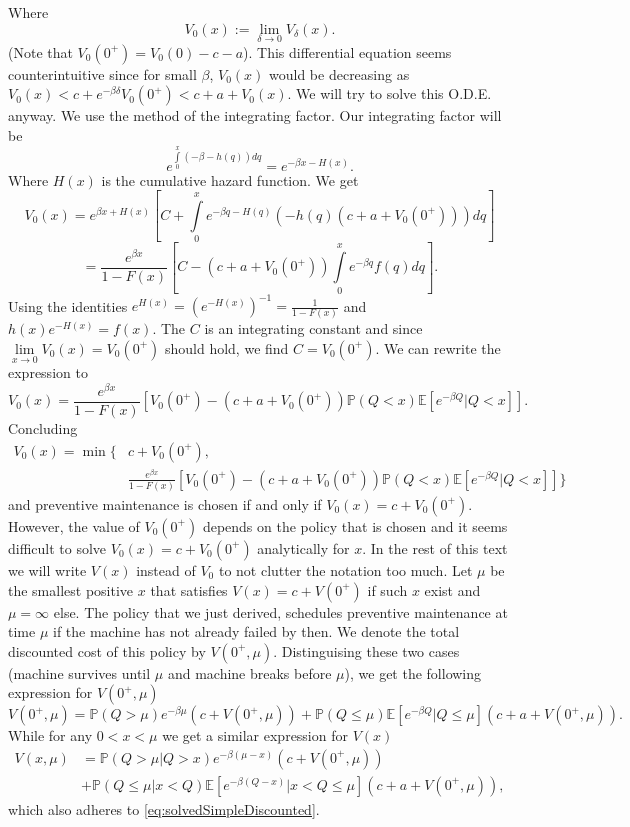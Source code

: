 Where
$$
V_0(x):=\lim\limits_{\delta\rightarrow 0} V_\delta(x).
$$
(Note that $V_0(0^+)=V_0(0)-c-a$).
This differential equation seems counterintuitive since for small $\beta$, $V_0(x)$ would be decreasing as $V_0(x)<c+e^{-\beta\delta} V_0(0^+)<c+a+V_0(x)$.
We will try to solve this O.D.E. anyway.
We use the method of the integrating factor.
Our integrating factor will be
$$
e^{\int\limits_0^x (-\beta - h(q))dq}=e^{-\beta x -H(x)}.
$$
Where $H(x)$ is the cumulative hazard function.
We get
$$
V_0(x)=e^{\beta x +H(x)} [C + \int\limits_0^x e^{-\beta q -H(q)}(-h(q)(c+a+V_0(0^+)))dq]
$$
$$
=\frac{e^{\beta x}}{1-F(x)} [C - (c+a+V_0(0^+))\int\limits_0^x e^{-\beta q}f(q)dq].
$$
Using the identities $e^{H(x)}=(e^{-H(x)})^{-1}=\frac{1}{1-F(x)}$ and $h(x)e^{-H(x)}=f(x)$.
The $C$ is an integrating constant and since $\lim\limits_{x\rightarrow 0}V_0(x)=V_0(0^+)$ should hold, we find $C=V_0(0^+)$.
We can rewrite the expression to
$$
V_0(x)=\frac{e^{\beta x}}{1-F(x)} [V_0(0^+)  - (c+a+V_0(0^+))\mathbb{P}(Q<x)\mathbb{E}[e^{-\beta Q}|Q<x]].
$$
Concluding
\begin{equation}\label{eq:solvedSimpleDiscounted}
\begin{split}
V_0(x)=\min\{&c+V_0(0^+),\\
&\frac{ e^{\beta x}}{1-F(x)} [V_0(0^+) - (c+a+V_0(0^+))\mathbb{P}(Q<x)\mathbb{E}[e^{-\beta Q}|Q<x]]
\}
\end{split}
\end{equation}
and preventive maintenance is chosen if and only if $V_0(x)=c+V_0(0^+)$.
However, the value of $V_0(0^+)$ depends on the policy that is chosen and it seems difficult to solve $V_0(x)=c+V_0(0^+)$ analytically for $x$.
In the rest of this text we will write $V(x)$ instead of $V_0$ to not clutter the notation too much. 
Let $\mu$ be the smallest positive $x$ that satisfies $V(x)=c+V(0^+)$ if such $x$ exist and $\mu=\infty$ else.
The policy that we just derived, schedules preventive maintenance at time $\mu$ if the machine has not already failed by then.
We denote the total discounted cost of this policy by $V(0^+,\mu)$.
Distinguising these two cases (machine survives until $\mu$ and machine breaks before $\mu$), we get the following expression for $V(0^+,\mu)$
\begin{equation}\label{eq:costToMinimize}
V(0^+,\mu)=\mathbb{P}(Q>\mu)e^{-\beta \mu}(c+V(0^+,\mu))+\mathbb{P}(Q\leq \mu)\mathbb{E}[e^{-\beta Q}|Q\leq \mu](c+a+V(0^+,\mu)).
\end{equation}
While for any $0<x<\mu$ we get a similar expression for $V(x)$
\begin{equation}
\begin{split}
V(x,\mu)&=\mathbb{P}(Q>\mu|Q>x)e^{-\beta (\mu-x)}(c+V(0^+,\mu))\\
&+\mathbb{P}(Q\leq \mu|x<Q)\mathbb{E}[e^{-\beta (Q-x)}|x<Q\leq \mu](c+a+V(0^+,\mu)),
\end{split}
\end{equation}
which also adheres to \eqref{eq:solvedSimpleDiscounted}.

